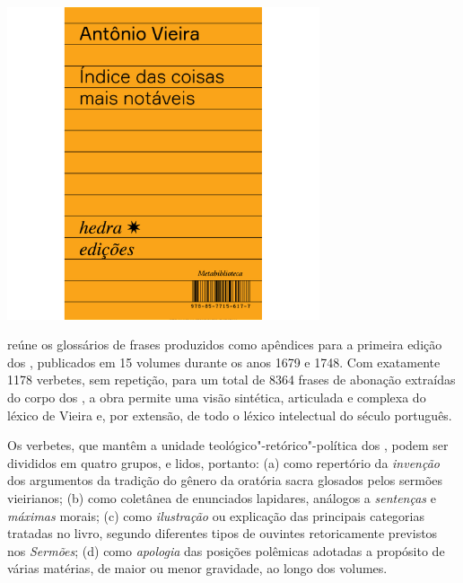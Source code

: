 \begin{center}
\hspace*{-2.5cm}
\hspace*{2.5cm}\includegraphics[width=92mm]{./grid/vieira.jpg}
\end{center}

\hspace*{-7cm}\hrulefill\hspace*{-7cm}

\medskip

 reúne os glossários de frases produzidos como apêndices para a primeira edição dos {}, publicados em 15
volumes durante os anos 1679 e 1748. Com exatamente 1178 verbetes,
sem repetição, para um total de 8364 frases de abonação extraídas do corpo dos
{}, a obra permite uma visão sintética, articulada e complexa do léxico de
Vieira e, por extensão, de todo o léxico intelectual do século 
português.

Os verbetes, que mantêm a unidade
teológico"-retórico"-política dos {}, podem ser divididos em quatro
grupos, e lidos, portanto: (a) como repertório da \textit{invenção} dos argumentos da
tradição do gênero da oratória sacra glosados pelos sermões vieirianos; (b)
como coletânea de enunciados lapidares, análogos a \textit{sentenças} e
\textit{máximas} morais; (c) como \textit{ilustração} ou explicação das
principais categorias tratadas no livro, segundo diferentes tipos de ouvintes
retoricamente previstos nos \textit{Sermões}; (d) como \textit{apologia} das
posições polêmicas adotadas a propósito de várias matérias, de maior ou menor
gravidade, ao longo dos volumes.

